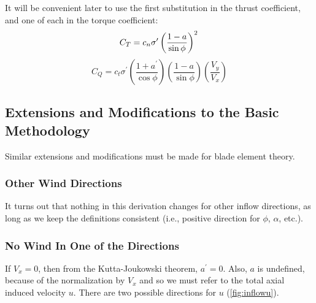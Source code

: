 It will be convenient later to use the first substitution in the thrust coefficient, and one of each in the torque coefficient:
\begin{equation}
    C_T = c_n \sigma^\prime \left(\frac{1-a}{\sin\phi}\right)^2\\
    \label{eq:CTbe}
\end{equation}
\begin{equation}
    C_Q = c_t \sigma^\prime \left(\frac{1 + a^\prime}{\cos\phi}\right)\left(\frac{1 - a}{\sin\phi}\right)\left(\frac{V_y}{V_x}\right)
    \label{eq:CQbe}
\end{equation}

\subsection{Extensions and Modifications to the Basic Methodology}

Similar extensions and modifications must be made for blade element theory.

\subsubsection{Other Wind Directions}

It turns out that nothing in this derivation changes for other inflow directions, as long as we keep the definitions consistent (i.e., positive direction for $\phi$, $\alpha$, etc.).


\subsubsection{No Wind In One of the Directions}
\label{sec:nowindtan}

If $V_x = 0$, then from the Kutta-Joukowski theorem, $a^\prime = 0$.  Also, $a$ is undefined, because of the normalization by $V_x$ and so we must refer to the total axial induced velocity $u$.  There are two possible directions for $u$ (\cref{fig:inflowu}).

